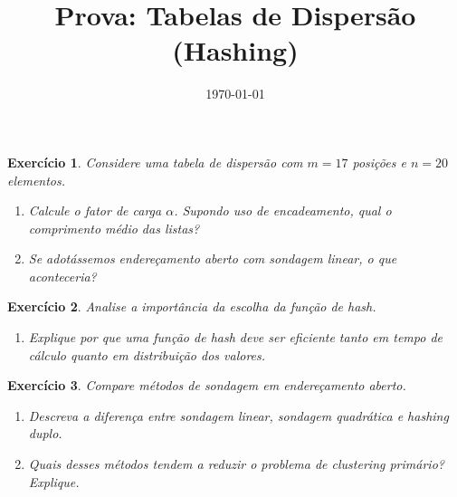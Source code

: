 \documentclass[12pt,oneside]{article}
\title{Prova: Tabelas de Dispersão (Hashing)}
\author{}
\date{\today}
\newtheorem{exercicio}{Exercício}
\begin{document}
\maketitle


\begin{exercicio}
Considere uma tabela de dispersão com $m = 17$ posições e $n = 20$ elementos.
\begin{enumerate}[label=\alph*)]
  \item Calcule o fator de carga $\alpha$. Supondo uso de encadeamento, qual o comprimento médio das listas?
  \item Se adotássemos endereçamento aberto com sondagem linear, o que aconteceria? 
\end{enumerate}
\end{exercicio}

\begin{exercicio}
Analise a importância da escolha da função de hash.
\begin{enumerate}[label=\alph*)]
  \item Explique por que uma função de hash deve ser eficiente tanto em tempo de cálculo quanto em distribuição dos valores.
\end{enumerate}
\end{exercicio}

\begin{exercicio}
Compare métodos de sondagem em endereçamento aberto.
\begin{enumerate}[label=\alph*)]
  \item Descreva a diferença entre sondagem linear, sondagem quadrática e hashing duplo.
  \item Quais desses métodos tendem a reduzir o problema de \emph{clustering primário}? Explique.
\end{enumerate}
\end{exercicio}



\end{document}
